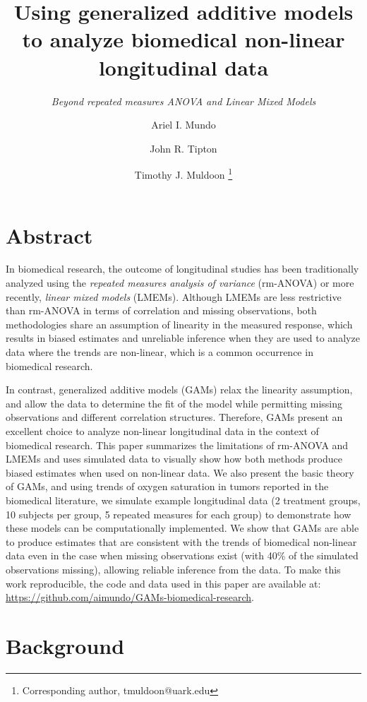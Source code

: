 \documentclass[
]{article}
\author[1]{Ariel I. Mundo \orcidaffila{}}
\author[2]{John R. Tipton \orcidaffilb{}}
\author[1]{Timothy J. Muldoon \thanks{Corresponding author, tmuldoon@uark.edu}}
\affil[1]{\footnotesize Department of Biomedical Engineering, University of Arkansas, Fayetteville, AR, USA}
\affil[2]{\footnotesize Department of Mathematical Sciences, University of Arkansas, Fayetteville, AR, USA}
\title{\textbf{Using generalized additive models to analyze biomedical non-linear longitudinal data}}
\subtitle{\emph{Beyond repeated measures ANOVA and Linear Mixed Models}}
\date{\vspace{-2.5em}}
\begin{document}
\maketitle

\hypertarget{abstract}{%
\section{Abstract}\label{abstract}}

In biomedical research, the outcome of longitudinal studies has been traditionally analyzed using the \emph{repeated measures analysis of variance} (rm-ANOVA) or more recently, \emph{linear mixed models} (LMEMs). Although LMEMs are less restrictive than rm-ANOVA in terms of correlation and missing observations, both methodologies share an assumption of linearity in the measured response, which results in biased estimates and unreliable inference when they are used to analyze data where the trends are non-linear, which is a common occurrence in biomedical research.

In contrast, generalized additive models (GAMs) relax the linearity assumption, and allow the data to determine the fit of the model while permitting missing observations and different correlation structures. Therefore, GAMs present an excellent choice to analyze non-linear longitudinal data in the context of biomedical research. This paper summarizes the limitations of rm-ANOVA and LMEMs and uses simulated data to visually show how both methods produce biased estimates when used on non-linear data. We also present the basic theory of GAMs, and using trends of oxygen saturation in tumors reported in the biomedical literature, we simulate example longitudinal data (2 treatment groups, 10 subjects per group, 5 repeated measures for each group) to demonstrate how these models can be computationally implemented. We show that GAMs are able to produce estimates that are consistent with the trends of biomedical non-linear data even in the case when missing observations exist (with 40\% of the simulated observations missing), allowing reliable inference from the data. To make this work reproducible, the code and data used in this paper are available at: \url{https://github.com/aimundo/GAMs-biomedical-research}.

\hypertarget{background}{%
\section{Background}\label{background}}
\end{document}
